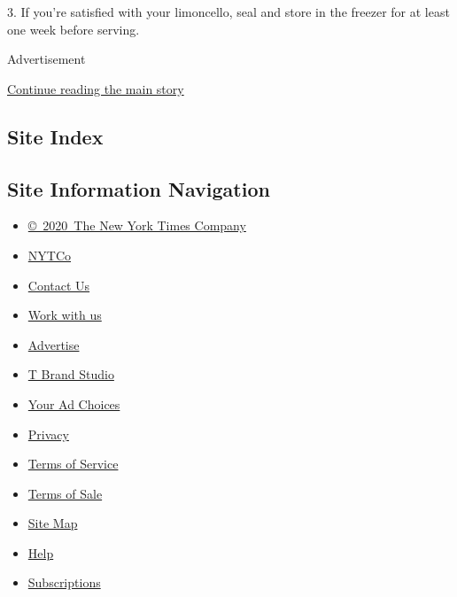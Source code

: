 3. If you're satisfied with your limoncello, seal and store in the
freezer for at least one week before serving.

Advertisement

\protect\hyperlink{after-bottom}{Continue reading the main story}

\hypertarget{site-index}{%
\subsection{Site Index}\label{site-index}}

\hypertarget{site-information-navigation}{%
\subsection{Site Information
Navigation}\label{site-information-navigation}}

\begin{itemize}
\tightlist
\item
  \href{https://help.nytimes3xbfgragh.onion/hc/en-us/articles/115014792127-Copyright-notice}{©~2020~The
  New York Times Company}
\end{itemize}

\begin{itemize}
\tightlist
\item
  \href{https://www.nytco.com/}{NYTCo}
\item
  \href{https://help.nytimes3xbfgragh.onion/hc/en-us/articles/115015385887-Contact-Us}{Contact
  Us}
\item
  \href{https://www.nytco.com/careers/}{Work with us}
\item
  \href{https://nytmediakit.com/}{Advertise}
\item
  \href{http://www.tbrandstudio.com/}{T Brand Studio}
\item
  \href{https://www.nytimes3xbfgragh.onion/privacy/cookie-policy\#how-do-i-manage-trackers}{Your
  Ad Choices}
\item
  \href{https://www.nytimes3xbfgragh.onion/privacy}{Privacy}
\item
  \href{https://help.nytimes3xbfgragh.onion/hc/en-us/articles/115014893428-Terms-of-service}{Terms
  of Service}
\item
  \href{https://help.nytimes3xbfgragh.onion/hc/en-us/articles/115014893968-Terms-of-sale}{Terms
  of Sale}
\item
  \href{https://spiderbites.nytimes3xbfgragh.onion}{Site Map}
\item
  \href{https://help.nytimes3xbfgragh.onion/hc/en-us}{Help}
\item
  \href{https://www.nytimes3xbfgragh.onion/subscription?campaignId=37WXW}{Subscriptions}
\end{itemize}
